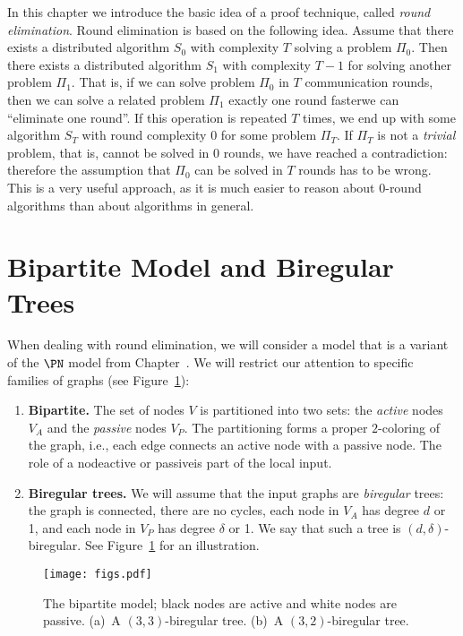

\noindent
In this chapter we introduce the basic idea of a proof technique, called \emph{round elimination}.
Round elimination is based on the following idea. Assume that there exists a distributed algorithm $S_0$ with complexity $T$ solving a problem $\Pi_0$. Then there exists a distributed algorithm $S_1$ with complexity $T-1$ for solving another problem $\Pi_1$. That is, if we can solve problem $\Pi_0$ in $T$ communication rounds, then we can solve a related problem $\Pi_1$ exactly one round faster\mydash we can ``eliminate one round''. If this operation is repeated $T$ times, we end up with some algorithm $S_T$ with round complexity $0$ for some problem $\Pi_T$. If $\Pi_T$ is not a \emph{trivial} problem, that is, cannot be solved in $0$ rounds, we have reached a contradiction: therefore the assumption that $\Pi_0$ can be solved in $T$ rounds has to be wrong. This is a very useful approach, as it is much easier to reason about $0$-round algorithms than about algorithms in general.

\section{Bipartite Model and Biregular Trees}

When dealing with round elimination, we will consider a model that is a variant of the $\PN$ model from Chapter~. We will restrict our attention to specific families of graphs (see Figure~\ref{fig:biregular}):
\begin{enumerate}
	\item \textbf{Bipartite.} The set of nodes $V$ is partitioned into two sets: the \emph{active} nodes $V_A$ and the \emph{passive} nodes $V_P$. The partitioning forms a proper $2$-coloring of the graph, i.e., each edge connects an active node with a passive node. The role of a node\mydash active or passive\mydash is part of the local input.
	\item \textbf{Biregular trees.} We will assume that the input graphs are \emph{biregular} trees: the graph is connected, there are no cycles, each node in $V_A$ has degree $d$ or 1, and each node in $V_P$ has degree $\delta$ or 1. We say that such a tree is $(d,\delta)$-biregular. See Figure~\ref{fig:biregular} for an illustration.
\end{enumerate}

\begin{figure}
	\centering
	\texttt{[image: figs.pdf]}
	\caption{The bipartite model; black nodes are active and white nodes are passive. (a)~A $(3,3)$-biregular tree. (b)~A $(3,2)$-biregular tree.} \label{fig:biregular}
\end{figure}

